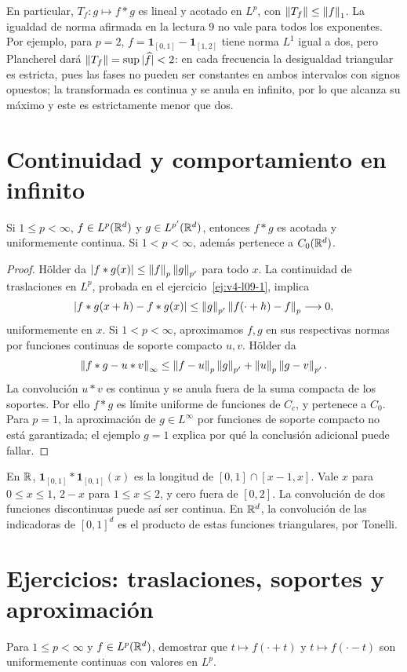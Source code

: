 En particular, $T_f:g\mapsto f*g$ es lineal y acotado en $L^p$, con $\left\lVert T_f\right\rVert\leq\left\lVert f\right\rVert_1$. La igualdad de norma afirmada en la lectura 9 no vale para todos los exponentes. Por ejemplo, para $p=2$, $f=\mathbf1_{[0,1]}-\mathbf1_{[1,2]}$ tiene norma $L^1$ igual a dos, pero Plancherel dará $\left\lVert T_f\right\rVert=\sup|\widehat f|<2$: en cada frecuencia la desigualdad triangular es estricta, pues las fases no pueden ser constantes en ambos intervalos con signos opuestos; la transformada es continua y se anula en infinito, por lo que alcanza su máximo y este es estrictamente menor que dos.

\section{Continuidad y comportamiento en infinito}
\begin{teorema}\label{v4:conv-continuidad}
Si $1\leq p<\infty$, $f\in L^p(\mathbb R^d)$ y $g\in L^{p'}(\mathbb R^d)$, entonces $f*g$ es acotada y uniformemente continua. Si $1<p<\infty$, además pertenece a $C_0(\mathbb R^d)$.
\end{teorema}
\begin{proof}
Hölder da $|f*g(x)|\leq\left\lVert f\right\rVert_p\left\lVert g\right\rVert_{p'}$ para todo $x$. La continuidad de traslaciones en $L^p$, probada en el ejercicio~\ref{ej:v4-l09-1}, implica
\[
 |f*g(x+h)-f*g(x)|\leq\left\lVert g\right\rVert_{p'}\left\lVert f(\cdot+h)-f\right\rVert_p\longrightarrow0,
\]
uniformemente en $x$. Si $1<p<\infty$, aproximamos $f,g$ en sus respectivas normas por funciones continuas de soporte compacto $u,v$. Hölder da
\[
 \left\lVert f*g-u*v\right\rVert_\infty\leq\left\lVert f-u\right\rVert_p\left\lVert g\right\rVert_{p'}+\left\lVert u\right\rVert_p\left\lVert g-v\right\rVert_{p'}.
\]
La convolución $u*v$ es continua y se anula fuera de la suma compacta de los soportes. Por ello $f*g$ es límite uniforme de funciones de $C_c$, y pertenece a $C_0$. Para $p=1$, la aproximación de $g\in L^\infty$ por funciones de soporte compacto no está garantizada; el ejemplo $g=1$ explica por qué la conclusión adicional puede fallar.
\end{proof}
\begin{ejemplo}
En $\mathbb R$, $\mathbf1_{[0,1]}*\mathbf1_{[0,1]}(x)$ es la longitud de $[0,1]\cap[x-1,x]$. Vale $x$ para $0\leq x\leq1$, $2-x$ para $1\leq x\leq2$, y cero fuera de $[0,2]$. La convolución de dos funciones discontinuas puede así ser continua. En $\mathbb R^d$, la convolución de las indicadoras de $[0,1]^d$ es el producto de estas funciones triangulares, por Tonelli.
\end{ejemplo}

\section{Ejercicios: traslaciones, soportes y aproximación}
\begin{ejercicio}\label{ej:v4-l09-1}
Para $1\leq p<\infty$ y $f\in L^p(\mathbb R^d)$, demostrar que $t\mapsto f(\cdot+t)$ y $t\mapsto f(\cdot-t)$ son uniformemente continuas con valores en $L^p$.
\end{ejercicio}

